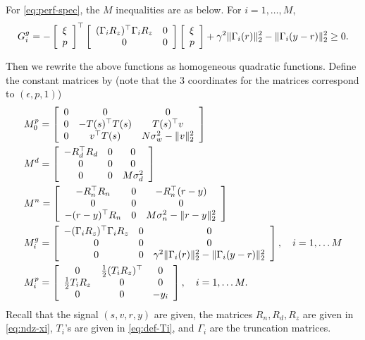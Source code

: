 \documentclass[11pt, onecolumn]{article}
\begin{document}
For \eqref{eq:perf-spec}, the $M$ inequalities are as below. For $i=1,\dots, M$,
\begin{align*}
  G^g_i= -   \left[ \begin{array}[c]{c} \xi\\ p \end{array} \right]^\top
    \left[ \begin{array}[c]{cc} (\Gamma_{i}R_z)^\top \Gamma_{i}R_z  &0 \\ 0 & 0  \end{array} \right]
  \left[ \begin{array}[c]{c} \xi\\ p \end{array} \right]
  + \gamma^2 \|\Gamma_{i}(r)\|_2^2 -   \|\Gamma_{i}(y-r)\|_2^2 \ge 0.
\end{align*}

Then we rewrite the above functions as homogeneous quadratic functions. Define the constant matrices
by (note that the 3 coordinates for the matrices correspond to $(\epsilon, p, 1)$)
\begin{align*}
  & M^p_0 = \left[ \begin{array}[c]{ccc} 0 &0&0 \\ 0 & -T(s)^\top T(s)& T(s)^\top v \\ 0& v^\top T(s)
    & N\sigma_w^2 - \|v\|_2^2 \end{array} \right]
  \\
  & M^d = \left[ \begin{array}[c]{ccc} -R_d^\top R_d &0 & 0 \\ 0 & 0 & 0 \\ 0&0&
    M\sigma_d^2 \end{array} \right]
  \\
  & M^n = \left[ \begin{array}[c]{ccc} -R_n^\top R_n &0& -R_n^\top(r-y) \\ 0 & 0& 0 \\ -(r-y)^\top
    R_n& 0 & M\sigma_n^2 - \|r-y\|_2^2 \end{array} \right]
  \\
  & M^g_i = \left[ \begin{array}[c]{ccc} - (\Gamma_{i}R_z)^\top \Gamma_{i}R_z &0 & 0 \\ 0 & 0 & 0 \\
    0&0& \gamma^2 \|\Gamma_{i}(r)\|_2^2 - \|\Gamma_{i}(y-r)\|_2^2 \end{array} \right], \quad i = 1,\dots M
  \\
  & M^p_i = \left[ \begin{array}[c]{ccc} 0 &{1\over 2}(T_iR_z)^\top & 0 \\ {1\over 2} T_iR_z & 0 & 0
    \\ 0&0& -y_i \end{array} \right], \quad i = 1,\dots M.
\end{align*}
Recall that the signal $(s,v, r, y)$ are given, the matrices $R_n, R_d,R_z$ are given in
\eqref{eq:ndz-xi}, $T_i$'s are given in \eqref{eq:def-Ti}, and $\Gamma_i$ are the truncation
matrices.
\end{document}

